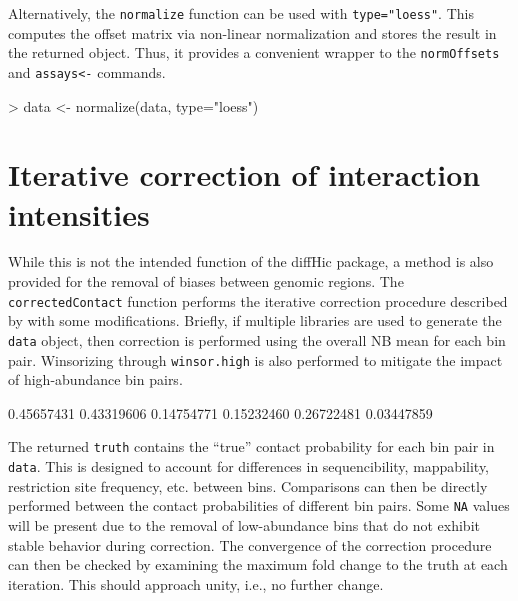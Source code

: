 \documentclass[12pt]{report}
\renewenvironment{Schunk}{\vspace{0pt}}{\vspace{0pt}}
\newcommand{\pkgname}{diffHic}
\newcommand{\code}[1]{{\small\texttt{#1}}}
\begin{document}
Alternatively, the \code{normalize} function can be used with \code{type="loess"}.
This computes the offset matrix via non-linear normalization and stores the result in the returned object.
Thus, it provides a convenient wrapper to the \code{normOffsets} and \code{assays<-} commands. 

\begin{Schunk}
\begin{Sinput}
> data <- normalize(data, type="loess")
\end{Sinput}
\end{Schunk}

\section{Iterative correction of interaction intensities}
\label{sec:itercor}
While this is not the intended function of the \pkgname{} package, a method is also provided for the removal of biases between genomic regions.
The \code{correctedContact} function performs the iterative correction procedure described by \cite{imakaev2012iterative} with some modifications.
Briefly, if multiple libraries are used to generate the \code{data} object, then correction is performed using the overall NB mean for each bin pair.
Winsorizing through \code{winsor.high} is also performed to mitigate the impact of high-abundance bin pairs.

\begin{Schunk}
\begin{Soutput}
[1] 0.45657431 0.43319606 0.14754771 0.15232460 0.26722481 0.03447859
\end{Soutput}
\end{Schunk}

The returned \code{truth} contains the ``true'' contact probability for each bin pair in \code{data}.
This is designed to account for differences in sequencibility, mappability, restriction site frequency, etc. between bins.
Comparisons can then be directly performed between the contact probabilities of different bin pairs.
Some \code{NA} values will be present due to the removal of low-abundance bins that do not exhibit stable behavior during correction.
The convergence of the correction procedure can then be checked by examining the maximum fold change to the truth at each iteration.
This should approach unity, i.e., no further change.
\end{document}
